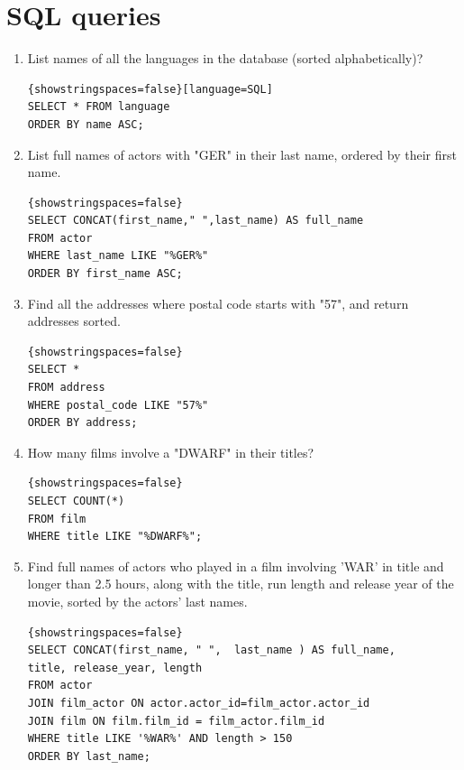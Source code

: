\documentclass{article}
\begin{document}
\section*{SQL queries}
\begin{enumerate}
	\item List names of all the languages in the database (sorted alphabetically)?\\
	\begin{lstlisting}{showstringspaces=false}[language=SQL]
SELECT * FROM language
ORDER BY name ASC;
	\end{lstlisting}
	
	\item List full names of actors with "GER" in their last name, ordered by their first name.\\
	\begin{lstlisting}{showstringspaces=false}
SELECT CONCAT(first_name," ",last_name) AS full_name
FROM actor
WHERE last_name LIKE "%GER%"
ORDER BY first_name ASC;
	\end{lstlisting}
	
	\item Find all the addresses where postal code starts with "57", and return addresses sorted.
	\begin{lstlisting}{showstringspaces=false}
SELECT *
FROM address
WHERE postal_code LIKE "57%"
ORDER BY address;
	\end{lstlisting}
	
	\item How many films involve a "DWARF" in their titles?
	
	\begin{lstlisting}{showstringspaces=false}
SELECT COUNT(*) 
FROM film
WHERE title LIKE "%DWARF%";
	\end{lstlisting}
	
	\item Find full names of actors who played in a film involving 'WAR' in title and longer than 2.5 hours, along with the title, run length and release year of the movie, sorted by the actors' last names. 
	
	\begin{lstlisting}{showstringspaces=false}
SELECT CONCAT(first_name, " ",  last_name ) AS full_name,
title, release_year, length
FROM actor 
JOIN film_actor ON actor.actor_id=film_actor.actor_id
JOIN film ON film.film_id = film_actor.film_id
WHERE title LIKE '%WAR%' AND length > 150
ORDER BY last_name;
	\end{lstlisting}


\end{enumerate}
\end{document}
